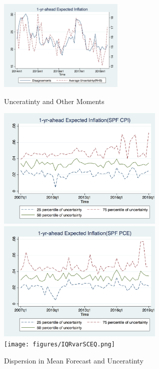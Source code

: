 \documentclass[]{article}
\begin{document}
\begin{figure}[h]
	\includegraphics[width=6cm]{figures/var_disg.png}\\
		\caption{Unceratinty and Other Moments}
\end{figure}


\begin{figure}[h]\label{IQR_Unceratitny}
	\centering
	\includegraphics[width=8cm]{figures/IQRvarCPIQ.png} \\
	\smallskip
	\includegraphics[width=8cm]{figures/IQRvarPCEQ.png}\\
		\smallskip
	\texttt{[image: figures/IQRvarSCEQ.png]}\\
	\caption{Dispersion in Mean Forecast and Unceratinty }
\end{figure}
\end{document}
